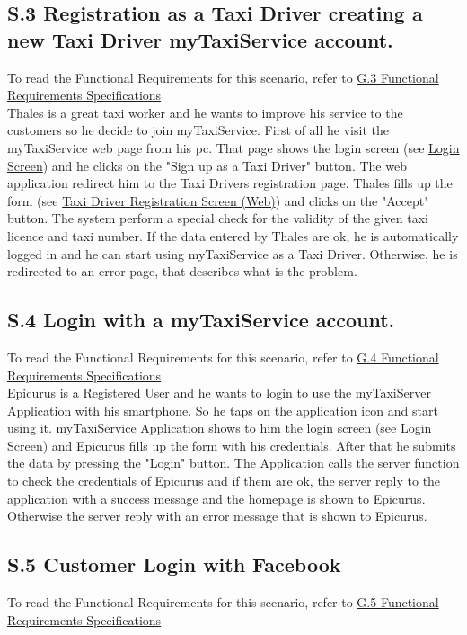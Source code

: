 		\subsection{S.3 Registration as a Taxi Driver creating a new Taxi Driver myTaxiService account.}\label{sec:TaxiDriverRegistrationScenario}
		To read the Functional Requirements for this scenario, refer to \hyperref[sec:frs3]{G.3 Functional Requirements Specifications}\\

		Thales is a great taxi worker and he wants to improve his service to the customers so he decide to join myTaxiService.
		First of all he visit the myTaxiService web page from his pc. That page shows the login screen (see \hyperref[login_m]{Login Screen}) and he clicks on the "Sign up as a Taxi Driver" button. The web application redirect him to the Taxi Drivers registration page. Thales fills up the form (see \hyperref[tregistration_w]{Taxi Driver Registration Screen (Web)}) and clicks on the "Accept" button. The system perform a special check for the validity of the given taxi licence and taxi number. If the data entered by Thales are ok, he is automatically logged in and he can start using myTaxiService as a Taxi Driver. Otherwise, he is redirected to an error page, that describes what is the problem.

		\subsection{S.4 Login with a myTaxiService account.}\label{sec:RegisteredUserLoginScenario}
		To read the Functional Requirements for this scenario, refer to \hyperref[sec:frs4]{G.4 Functional Requirements Specifications}\\

		Epicurus is a Registered User and he wants to login to use the myTaxiServer Application with his smartphone. So he taps on the application icon and start using it. myTaxiService Application shows to him the login screen (see \hyperref[login_m]{Login Screen}) and Epicurus fills up the form with his credentials. After that he submits the data by pressing the "Login" button. The Application calls the server function to check the credentials of Epicurus and if them are ok, the server reply to the application with a success message and the homepage is shown to Epicurus. Otherwise the server reply with an error message that is shown to Epicurus.

		\subsection{S.5 Customer Login with Facebook}
		To read the Functional Requirements for this scenario, refer to \hyperref[sec:frs5]{G.5 Functional Requirements Specifications}\\

